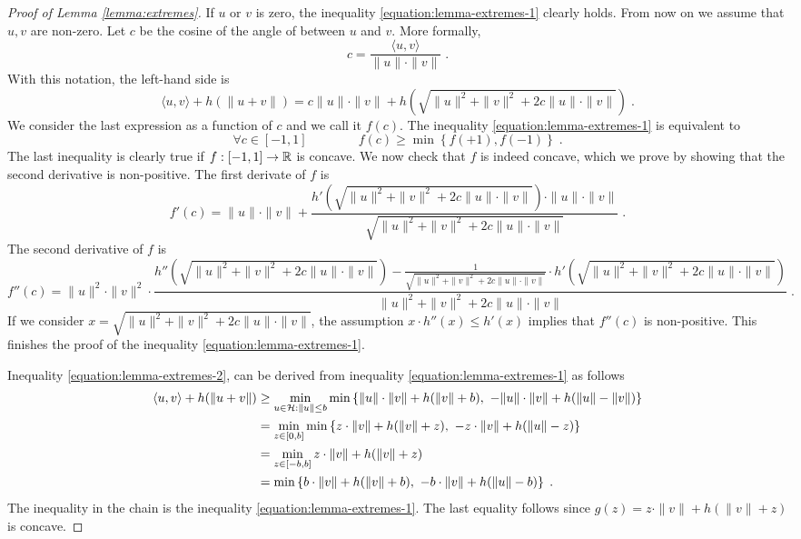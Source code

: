 \begin{proof}[Proof of Lemma \ref{lemma:extremes}]
If $u$ or $v$ is zero, the inequality \eqref{equation:lemma-extremes-1} clearly holds. From now on we assume that
$u,v$ are non-zero. Let $c$ be the cosine of the angle of between $u$ and $v$.
More formally,
$$
c = \frac{\langle u, v \rangle}{\|u\| \cdot \|v\|} \; .
$$
With this notation, the left-hand side is
$$
\langle u, v \rangle + h(\|u + v\|) = c \|u\| \cdot \|v\|  + h(\sqrt{\|u\|^2 + \|v\|^2 + 2 c \|u\| \cdot \|v\|}) \; .
$$
We consider the last expression as a function of $c$ and we call it $f(c)$. The
inequality \eqref{equation:lemma-extremes-1} is equivalent to
$$
\forall c \in [-1,1] \qquad \qquad f(c) \ge \min \left\{f(+1), f(-1)\right\} \; .
$$
The last inequality is clearly true if $f:[-1,1] \to \mathbb{R}$ is concave. We now
check that $f$ is indeed concave, which we prove by showing that the second
derivative is non-positive. The first derivate of $f$ is
$$
f'(c) = \|u\| \cdot \|v\| + \frac{h'(\sqrt{\|u\|^2 + \|v\|^2 + 2 c \|u\| \cdot \|v\|}) \cdot \|u\| \cdot \|v\|}{\sqrt{\|u\|^2 + \|v\|^2 + 2 c \|u\| \cdot \|v\|}} \; .
$$
The second derivative of $f$ is
$$
f''(c) = \|u\|^2 \cdot \|v\|^2 \cdot \frac{h''(\sqrt{\|u\|^2 + \|v\|^2 + 2 c \|u\| \cdot \|v\|})  - \frac{1}{\sqrt{\|u\|^2 + \|v\|^2 + 2c \|u\| \cdot \|v\|}} \cdot h'(\sqrt{\|u\|^2 + \|v\|^2 + 2 c \|u\| \cdot \|v\|})  }{\|u\|^2 + \|v\|^2 + 2 c \|u\| \cdot \|v\|} \; .
$$
If we consider $x=\sqrt{\|u\|^2 + \|v\|^2 + 2 c \|u\| \cdot \|v\|}$, the
assumption $x \cdot h''(x) \le h'(x)$ implies that $f''(c)$ is non-positive.
This finishes the proof of the inequality \eqref{equation:lemma-extremes-1}.

Inequality \eqref{equation:lemma-extremes-2}, can be derived from inequality
\eqref{equation:lemma-extremes-1} as follows
\begin{align*}
\langle u, v \rangle + h(\|u + v\|)
& \ge \min_{u \in \H : \|u\| \le b} \min \left\{ \|u\| \cdot \|v\| + h(\|v\| + b), \ - \|u\| \cdot \|v\| + h(\|u\| - \|v\|) \right\} \\
& = \min_{z \in [0,b]} \min \left\{ z \cdot \|v\| + h(\|v\| + z), \ - z \cdot \|v\| + h(\|u\| - z) \right\} \\
& = \min_{z \in [-b,b]} z \cdot \|v\| + h(\|v\| + z) \\
& = \min \left\{ b \cdot \|v\| + h(\|v\| + b), \ - b \cdot \|v\| + h(\|u\| - b) \right\} \; .
\end{align*}
The inequality in the chain is the inequality \eqref{equation:lemma-extremes-1}.
The last equality follows since $g(z) = z \cdot \|v\| + h(\|v\| + z)$
is concave.
\end{proof}

